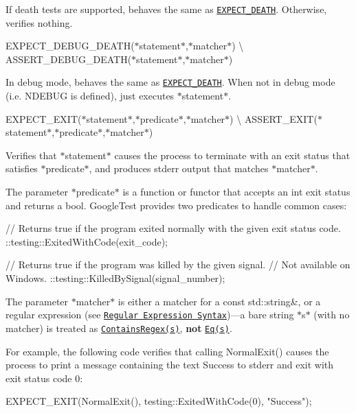 If death tests are supported, behaves the same as \href{#EXPECT_DEATH}{\tt {\ttfamily E\+X\+P\+E\+C\+T\+\_\+\+D\+E\+A\+TH}}. Otherwise, verifies nothing.

{\ttfamily E\+X\+P\+E\+C\+T\+\_\+\+D\+E\+B\+U\+G\+\_\+\+D\+E\+A\+TH(}$\ast${\ttfamily statement}$\ast${\ttfamily ,}$\ast${\ttfamily matcher}$\ast${\ttfamily )} \textbackslash{} {\ttfamily A\+S\+S\+E\+R\+T\+\_\+\+D\+E\+B\+U\+G\+\_\+\+D\+E\+A\+TH(}$\ast${\ttfamily statement}$\ast${\ttfamily ,}$\ast${\ttfamily matcher}$\ast${\ttfamily )}

In debug mode, behaves the same as \href{#EXPECT_DEATH}{\tt {\ttfamily E\+X\+P\+E\+C\+T\+\_\+\+D\+E\+A\+TH}}. When not in debug mode (i.\+e. {\ttfamily N\+D\+E\+B\+UG} is defined), just executes $\ast${\ttfamily statement}$\ast$.

{\ttfamily E\+X\+P\+E\+C\+T\+\_\+\+E\+X\+IT(}$\ast${\ttfamily statement}$\ast${\ttfamily ,}$\ast${\ttfamily predicate}$\ast${\ttfamily ,}$\ast${\ttfamily matcher}$\ast${\ttfamily )} \textbackslash{} {\ttfamily A\+S\+S\+E\+R\+T\+\_\+\+E\+X\+IT(}$\ast${\ttfamily statement}$\ast${\ttfamily ,}$\ast${\ttfamily predicate}$\ast${\ttfamily ,}$\ast${\ttfamily matcher}$\ast${\ttfamily )}

Verifies that $\ast${\ttfamily statement}$\ast$ causes the process to terminate with an exit status that satisfies $\ast${\ttfamily predicate}$\ast$, and produces {\ttfamily stderr} output that matches $\ast${\ttfamily matcher}$\ast$.

The parameter $\ast${\ttfamily predicate}$\ast$ is a function or functor that accepts an {\ttfamily int} exit status and returns a {\ttfamily bool}. Google\+Test provides two predicates to handle common cases\+:


\begin{DoxyCode}
\textcolor{comment}{// Returns true if the program exited normally with the given exit status code.}
::testing::ExitedWithCode(exit\_code);

\textcolor{comment}{// Returns true if the program was killed by the given signal.}
\textcolor{comment}{// Not available on Windows.}
::testing::KilledBySignal(signal\_number);
\end{DoxyCode}


The parameter $\ast${\ttfamily matcher}$\ast$ is either a matcher for a {\ttfamily const std\+::string\&}, or a regular expression (see \href{../advanced.md#regular-expression-syntax}{\tt Regular Expression Syntax})—a bare string $\ast${\ttfamily s}$\ast$ (with no matcher) is treated as \href{matchers.md#string-matchers}{\tt {\ttfamily Contains\+Regex(s)}}, {\bfseries not} \href{matchers.md#generic-comparison}{\tt {\ttfamily Eq(s)}}.

For example, the following code verifies that calling {\ttfamily Normal\+Exit()} causes the process to print a message containing the text {\ttfamily Success} to {\ttfamily stderr} and exit with exit status code 0\+:


\begin{DoxyCode}
EXPECT\_EXIT(NormalExit(), testing::ExitedWithCode(0), \textcolor{stringliteral}{"Success"});
\end{DoxyCode}
 